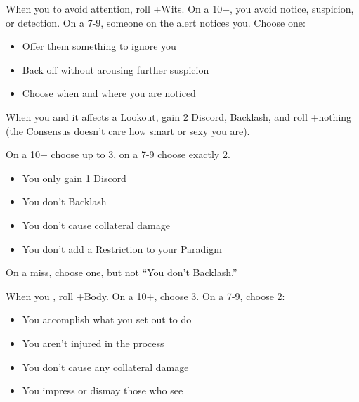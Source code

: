 \begin{multicols}{3}
  \SEPARATOR

  \begin{move}
    When you  to avoid attention, roll
    +Wits. On a 10+, you avoid notice, suspicion, or detection. On a
    7-9, someone on the alert notices you. Choose one:
    \begin{itemize}
      \setlength\itemsep{0em}
    \item Offer them something to ignore you
    \item Back off without arousing further suspicion
    \item Choose when and where you are noticed
    \end{itemize}
  \end{move}

  \SEPARATOR

  \begin{move}
    When you  and it affects a Lookout, gain
    2 Discord, Backlash, and roll +nothing (the Consensus doesn't care
    how smart or sexy you are).

    On a 10+ choose up to 3, on a 7-9 choose exactly 2.
    \begin{itemize}
      \setlength\itemsep{0em}
    \item You only gain 1 Discord
    \item You don't Backlash
    \item You don't cause collateral damage
    \item You don't add a Restriction to your Paradigm
    \end{itemize}
    On a miss, choose one, but not ``You don't Backlash.''
  \end{move}

  \columnbreak
  
  \begin{move}
    When you , roll
    +Body. On a 10+, choose 3. On a 7-9, choose 2:
    \begin{itemize}
      \setlength\itemsep{0em}
    \item You accomplish what you set out to do
    \item You aren't injured in the process
    \item You don't cause any collateral damage
    \item You impress or dismay those who see
    \end{itemize}
  \end{move}


\end{multicols}

